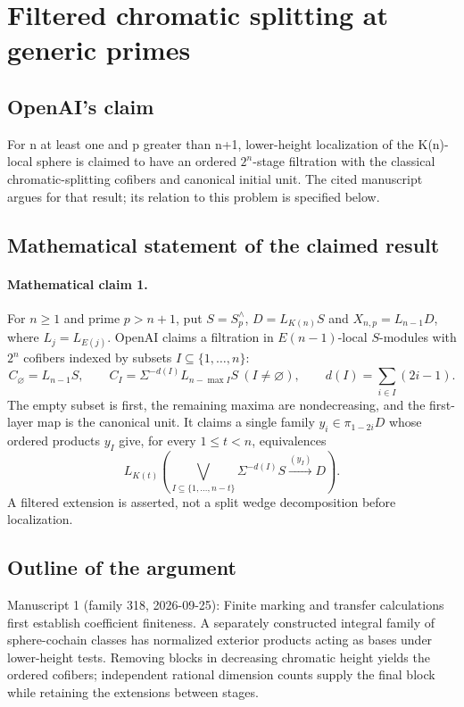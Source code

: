 \documentclass[11pt]{article}
\begin{document}
\section*{Filtered chromatic splitting at generic primes}

\subsection{OpenAI's claim}
For n at least one and p greater than n+1, lower-height localization of the K(n)-local sphere is claimed to have an ordered \(2^n\)-stage filtration with the classical chromatic-splitting cofibers and canonical initial unit. The cited manuscript argues for that result; its relation to this problem is specified below.

\subsection{Mathematical statement of the claimed result}
\paragraph{Mathematical claim 1.} For $n\ge1$ and prime $p>n+1$, put $S=S_p^\wedge$, $D=L_{K(n)}S$ and $X_{n,p}=L_{n-1}D$, where $L_j=L_{E(j)}$. OpenAI claims a filtration in $E(n-1)$-local $S$-modules with $2^n$ cofibers indexed by subsets $I\subseteq\{1,\ldots,n\}$:
\[
C_\varnothing=L_{n-1}S,\qquad C_I=\Sigma^{-d(I)}L_{n-\max I}S\ (I\ne\varnothing),\qquad d(I)=\sum_{i\in I}(2i-1).
\]
The empty subset is first, the remaining maxima are nondecreasing, and the first-layer map is the canonical unit. It claims a single family $y_i\in\pi_{1-2i}D$ whose ordered products $y_I$ give, for every $1\le t<n$, equivalences
\[
L_{K(t)}\left(\bigvee_{I\subseteq\{1,\ldots,n-t\}}\Sigma^{-d(I)}S\xrightarrow{(y_I)}D\right).
\]
A filtered extension is asserted, not a split wedge decomposition before localization.

\subsection{Outline of the argument}
Manuscript 1 (family 318, 2026-09-25): Finite marking and transfer calculations first establish coefficient finiteness. A separately constructed integral family of sphere-cochain classes has normalized exterior products acting as bases under lower-height tests. Removing blocks in decreasing chromatic height yields the ordered cofibers; independent rational dimension counts supply the final block while retaining the extensions between stages.
\end{document}
